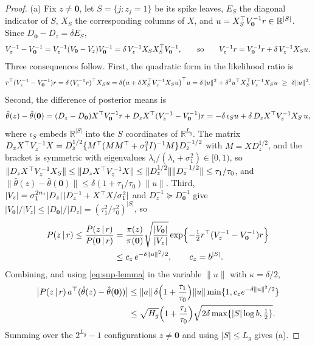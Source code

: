 \begin{proof}
(a) Fix $z\ne\mathbf 0$, let $S=\{j:z_j=1\}$ be its spike leaves, $E_S$ the diagonal indicator of $S$, $X_S$ the corresponding columns of $X$, and $u=X_S^{\top} V_{\mathbf 0}^{-1}r\in\mathbb R^{|S|}$. Since $D_{\mathbf 0}-D_z=\delta E_S$,
\[
V_z^{-1}-V_{\mathbf 0}^{-1}=V_z^{-1}(V_{\mathbf 0}-V_z)V_{\mathbf 0}^{-1}=\delta\,V_z^{-1}X_SX_S^{\top} V_{\mathbf 0}^{-1},
\qquad\text{so}\qquad
V_z^{-1}r=V_{\mathbf 0}^{-1}r+\delta\,V_z^{-1}X_Su .
\]
Three consequences follow. First, the quadratic form in the likelihood ratio is
\[
r\tr(V_z^{-1}-V_{\mathbf 0}^{-1})r=\delta\,(V_z^{-1}r)\tr X_Su=\delta\bigl(u+\delta X_S\tr V_z^{-1}X_Su\bigr)\tr u=\delta\|u\|^2+\delta^2u\tr X_S\tr V_z^{-1}X_Su\ \ge\ \delta\|u\|^2 .
\]
Second, the difference of posterior means is
\[
\hat\theta(z)-\hat\theta(\mathbf 0)=(D_z-D_{\mathbf 0})X^{\top} V_{\mathbf 0}^{-1}r+D_zX^{\top}(V_z^{-1}-V_{\mathbf 0}^{-1})r=-\delta\,\iota_Su+\delta\,D_zX^{\top} V_z^{-1}X_S\,u ,
\]
where $\iota_S$ embeds $\mathbb R^{|S|}$ into the $S$ coordinates of $\mathbb R^{L_g}$. The matrix $D_zX^{\top} V_z^{-1}X=D_z^{1/2}\{M^{\top}(MM^{\top}+\sigma_1^2I)^{-1}M\}D_z^{-1/2}$ with $M=XD_z^{1/2}$, and the bracket is symmetric with eigenvalues $\lambda_i/(\lambda_i+\sigma_1^2)\in[0,1)$, so $\|D_zX^{\top} V_z^{-1}X_S\|\le\|D_zX^{\top} V_z^{-1}X\|\le\|D_z^{1/2}\|\|D_z^{-1/2}\|\le\tau_1/\tau_0$, and $\|\hat\theta(z)-\hat\theta(\mathbf 0)\|\le\delta(1+\tau_1/\tau_0)\|u\|$. Third, $|V_z|=\sigma_1^{2n_1}|D_z|\,|D_z^{-1}+X^{\top} X/\sigma_1^2|$ and $D_z^{-1}\succeq D_{\mathbf 0}^{-1}$ give $|V_{\mathbf 0}|/|V_z|\le|D_{\mathbf 0}|/|D_z|=(\tau_1^2/\tau_0^2)^{|S|}$, so
\begin{align*}
P(z\,\vert\, r)\le\frac{P(z\,\vert\, r)}{P(\mathbf 0\,\vert\, r)}
&=\frac{\pi(z)}{\pi(\mathbf 0)}\sqrt{\frac{|V_{\mathbf 0}|}{|V_z|}}\exp\Bigl\{-\tfrac12r^{\top}(V_z^{-1}-V_{\mathbf 0}^{-1})r\Bigr\}\\
&\le c_z\,e^{-\delta\|u\|^2/2},\qquad c_z=b^{|S|}.
\end{align*}
Combining, and using \eqref{eq:sup-lemma} in the variable $\|u\|$ with $\kappa=\delta/2$,
\begin{align*}
\bigl|P(z\,\vert\, r)\,a^{\top}(\hat\theta(z)-\hat\theta(\mathbf 0))\bigr|
&\le\|a\|\,\delta\Bigl(1+\frac{\tau_1}{\tau_0}\Bigr)\|u\|\min\{1,c_ze^{-\delta\|u\|^2/2}\}\\
&\le \sqrt{H_g}\Bigl(1+\frac{\tau_1}{\tau_0}\Bigr)\sqrt{2\delta\max\{|S|\log b,\tfrac12\}} .
\end{align*}
Summing over the $2^{L_g}-1$ configurations $z\ne\mathbf 0$ and using $|S|\le L_g$ gives (a).


\end{proof}
